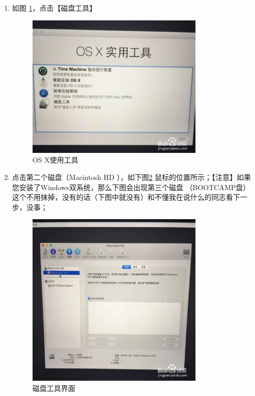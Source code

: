 \documentclass{article}
\begin{document}
\begin{enumerate}
\begin{figure}[!htb]
  \end{figure}
\item 如图 \ref{cipangongju}，点击【磁盘工具】
 \begin{figure}[!htb] %
 \centering
 \includegraphics[width=0.8\textwidth]{figures/cipangongju.png}
  \caption{OS X使用工具}
\label{cipangongju}

 \end{figure}
\item 点击第二个磁盘（Macintosh HD ），如下图\ref{hd} 鼠标的位置所示；【注意】如果您安装了Windows双系统，那么下图会出现第三个磁盘  （BOOTCAMP盘）这个不用抹掉，没有的话（下图中就没有）和不懂我在说什么的同志看下一步，没事；
 \begin{figure}[!htb] %
 \centering
 \includegraphics[width=0.8\textwidth]{figures/hd.png}
 \caption{磁盘工具界面}
\label{hd}
 

\end{figure}
\end{enumerate}
\end{document}
